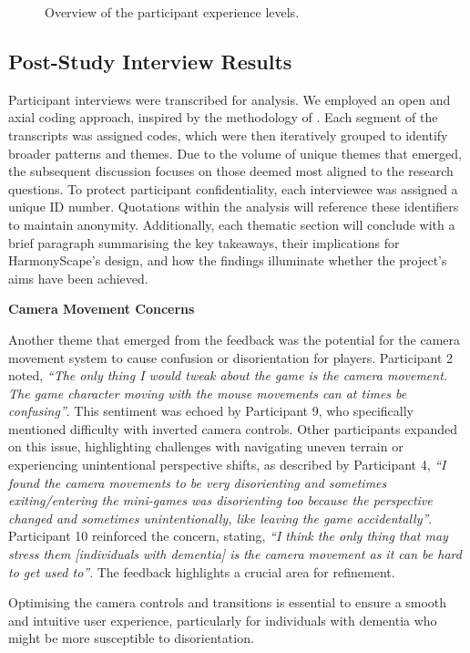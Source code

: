 \documentclass{l4proj}
\begin{document}
\begin{figure}[h]
  \caption{Overview of the participant experience levels.}  
  \label{fig:participant_experience} 
\end{figure}


\subsection{Post-Study Interview Results}
Participant interviews were transcribed for analysis. We employed an open and axial coding approach, inspired by the methodology of \cite{strauss_basics_1990}.  Each segment of the transcripts was assigned codes, which were then iteratively grouped to identify broader patterns and themes. Due to the volume of unique themes that emerged, the subsequent discussion focuses on those deemed most aligned to the research questions. To protect participant confidentiality, each interviewee was assigned a unique ID number. Quotations within the analysis will reference these identifiers to maintain anonymity. Additionally, each thematic section will conclude with a brief paragraph summarising the key takeaways, their implications for HarmonyScape's design, and how the findings illuminate whether the project's aims have been achieved.
\newline

\textbf{Camera Movement Concerns}

Another theme that emerged from the feedback was the potential for the camera movement system to cause confusion or disorientation for players. Participant 2 noted, \emph{“The only thing I would tweak about the game is the camera movement. The game character moving with the mouse movements can at times be confusing”}. This sentiment was echoed by Participant 9, who specifically mentioned difficulty with inverted camera controls. Other participants expanded on this issue, highlighting challenges with navigating uneven terrain or experiencing unintentional perspective shifts, as described by Participant 4, \emph{“I found the camera movements to be very disorienting and sometimes exiting/entering the mini-games was disorienting too because the perspective changed and sometimes unintentionally, like leaving the game accidentally”}. Participant 10 reinforced the concern, stating, \emph{“I think the only thing that may stress them [individuals with dementia] is the camera movement as it can be hard to get used to”}. The feedback highlights a crucial area for refinement. 

Optimising the camera controls and transitions is essential to ensure a smooth and intuitive user experience, particularly for individuals with dementia who might be more susceptible to disorientation.
\newline
\end{document}
